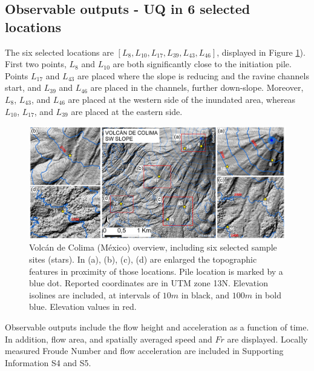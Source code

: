 \documentclass{article}
\begin{document}
\subsection{Observable outputs - UQ in 6 selected locations}\label{Obs2}
The six selected locations are $[L_8, L_{10}, L_{17}, L_{39}, L_{43}, L_{46}]$, displayed in Figure \ref{fig:Colima-extra}). First two points, $L_8$ and $L_{10}$ are both significantly close to the initiation pile. Points $L_{17}$ and $L_{43}$ are placed where the slope is reducing and the ravine channels start, and $L_{39}$ and $L_{46}$ are placed in the channels, further down-slope. Moreover, $L_8$, $L_{43}$, and $L_{46}$ are placed at the western side of the inundated area, whereas $L_{10}$, $L_{17}$, and $L_{39}$ are placed at the eastern side.
\begin{figure}[H]
         \centering
        \includegraphics[width=1\textwidth]{BAF_VolcanDeColima/FigExtra.jpg}
        \caption{Volc{\'a}n de Colima (M{\'e}xico) overview, including six selected sample sites (stars). In (a), (b), (c), (d) are enlarged the topographic features in proximity of those locations. Pile location is marked by a blue dot. Reported coordinates are in UTM zone 13N. Elevation isolines are included, at intervals of $10 m$ in black, and $100m$ in bold blue. Elevation values in red.}
        \label{fig:Colima-extra}
\end{figure}
Observable outputs include the flow height and acceleration as a function of time. In addition, flow area, and spatially averaged speed and $Fr$ are displayed. Locally measured Froude Number and flow acceleration are included in Supporting Information S4 and S5.
\newpage
\end{document}
